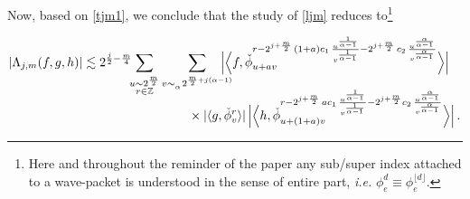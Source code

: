 \documentclass[a4paper,reqno]{amsart}
\numberwithin{equation}{section}
\theoremstyle{definition}
\newcommand{\Z}{\mathbb{Z}}
\def\a{\alpha}
\def\v{\varepsilon}
\def\L{\Lambda}
\begin{document}
Now, based on \eqref{tjm1}, we conclude that the study of \eqref{ljm} reduces to\footnote{Here and throughout the reminder of the paper any sub/super index attached to a wave-packet is understood in the sense of entire part, \textit{i.e.}  $\phi_{e}^d\equiv \phi_{e}^{\lfloor d\rfloor}$.}

\begin{align}
&|\L_{j,m}(f,g,h)|\lesssim
2^{\frac{j}{2}{-}\frac{m}{4}}\,\hspace{-.2cm}\sum_{\substack{\\u\sim 2^{\frac{m}{2}}\\ r\in\Z}} \sum_{\substack{\\v\sim_{{}_{\a}} 2^{\frac{m}{2}{+}j(\a{-}1)}}}
\hspace{-.4cm}\Big|\Big\langle f,  \check{\phi}_{u+ av}^{r-2^{j+\frac{m}{2}}\,(1+a) c_1\,\frac{u^{\frac{1}{\a-1}}}{v^{\frac{1}{\a-1}}}-
	2^{j+\frac{m}{2}}\,c_2\,\frac{u^{\frac{\a}{\a-1}}}{v^{\frac{\a}{\a-1}}}}\Big\rangle\Big|\,\nonumber\\[-2ex]
&\hspace{5cm}\times
|\langle g,  \check{\phi}_{v}^r\rangle|\,
\Big|\Big\langle h,  \check{\phi}_{u+(1+a) v}^{r- 2^{j+\frac{m}{2}}\,a c_1\,\frac{u^{\frac{1}{\a-1}}}{v^{\frac{1}{\a-1}}}-
	2^{j+\frac{m}{2}}c_2\,\frac{u^{\frac{\a}{\a-1}}}{v^{\frac{\a}{\a-1}}}}\Big\rangle\Big|\,.\label{ljm0a}
\end{align}
\end{document}
